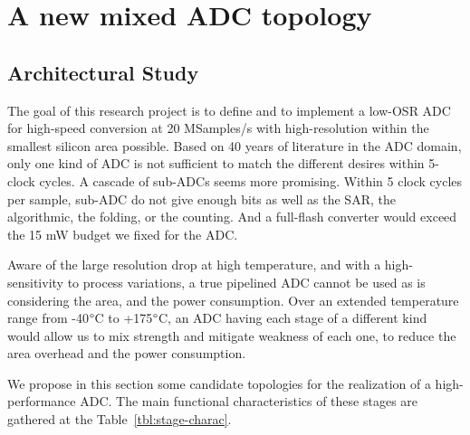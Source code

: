 \chapter{A new mixed ADC topology}
\label{sec:adc-implementation}

\ifpdf
    \graphicspath{{Chapter4/Figs/Raster/}{Chapter4/Figs/PDF/}{Chapter4/Figs/}}
\else
    \graphicspath{{Chapter4/Figs/Vector/}{Chapter4/Figs/}}
\fi

\section{Architectural Study}
The goal of this research project is to define and to implement a low-OSR ADC for high-speed conversion at 20 MSamples/s with high-resolution within the smallest silicon area possible. Based on 40 years of literature in the ADC domain, only one kind of ADC is not sufficient to match the different desires within 5-clock cycles. A cascade of sub-ADCs seems more promising. Within 5 clock cycles per sample, sub-ADC do not give enough bits as well as the SAR, the algorithmic, the folding, or the counting. And a full-flash converter would exceed the 15 mW budget we fixed for the ADC\@.

Aware of the large resolution drop at high temperature, and with a high-sensitivity to process variations, a true pipelined ADC cannot be used as is considering the area, and the power consumption. Over an extended temperature range from -40\(\degree \)C to +175\(\degree \)C, an ADC having each stage of a different kind would allow us to mix strength and mitigate weakness of each one, to reduce the area overhead and the power consumption.

We propose in this section some candidate topologies for the realization of a high-performance ADC\@. The main functional characteristics of these stages are gathered at the Table~\ref{tbl:stage-charac}.


